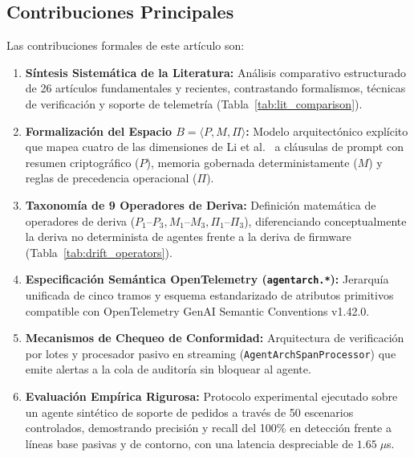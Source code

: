 \documentclass[conference]{IEEEtran}
\begin{document}
\subsection{Contribuciones Principales}
Las contribuciones formales de este art\'iculo son:
\begin{enumerate}
    \item \textbf{S\'intesis Sistem\'atica de la Literatura:} An\'alisis comparativo estructurado de 26 art\'iculos fundamentales y recientes, contrastando formalismos, t\'ecnicas de verificaci\'on y soporte de telemetr\'ia (Tabla~\ref{tab:lit_comparison}).
    \item \textbf{Formalizaci\'on del Espacio $B = \langle P, M, \Pi \rangle$:} Modelo arquitect\'onico expl\'icito que mapea cuatro de las dimensiones de Li et al.~\cite{li2026} a cl\'ausulas de prompt con resumen criptogr\'afico ($P$), memoria gobernada deterministamente ($M$) y reglas de precedencia operacional ($\Pi$).
    \item \textbf{Taxonom\'ia de 9 Operadores de Deriva:} Definici\'on matem\'atica de operadores de deriva ($P_1\text{--}P_3, M_1\text{--}M_3, \Pi_1\text{--}\Pi_3$), diferenciando conceptualmente la deriva no determinista de agentes frente a la deriva de firmware~\cite{deangelis2026} (Tabla~\ref{tab:drift_operators}).
    \item \textbf{Especificaci\'on Sem\'antica OpenTelemetry (\texttt{agentarch.*}):} Jerarqu\'ia unificada de cinco tramos y esquema estandarizado de atributos primitivos compatible con OpenTelemetry GenAI Semantic Conventions v1.42.0.
    \item \textbf{Mecanismos de Chequeo de Conformidad:} Arquitectura de verificaci\'on por lotes y procesador pasivo en streaming (\texttt{AgentArchSpanProcessor}) que emite alertas a la cola de auditor\'ia sin bloquear al agente.
    \item \textbf{Evaluaci\'on Emp\'irica Rigurosa:} Protocolo experimental ejecutado sobre un agente sint\'etico de soporte de pedidos a trav\'es de 50 escenarios controlados, demostrando precisi\'on y recall del 100\% en detecci\'on frente a l\'ineas base pasivas y de contorno, con una latencia despreciable de $1.65\;\mu$s.
\end{enumerate}
\end{document}
